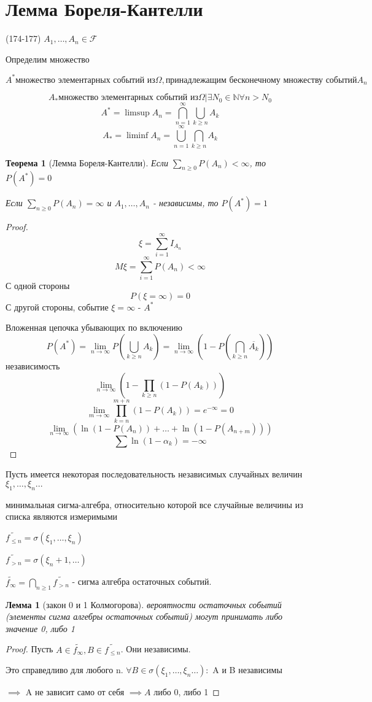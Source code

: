 \documentclass[a4paper]{article}
\newtheorem{theorem}{Теорема}[section]
\newtheorem{lemma}{Лемма}[section]
\theoremstyle{definition}
\theoremstyle{remark}
\begin{document}
\section{Лемма Бореля-Кантелли}
(174-177)
$A_1, \dots, A_n \in \mathcal{F}$

Определим множество 

\[A^* \text{множество элементарных событий из} \Omega, \text{принадлежащим бесконечному множеству событий}A_n\]

\[A_*\text{множество элементарных событий из} \Omega | \exists N_0 \in \mathbb{N}\forall n> N_0 \]
\[A^* = \limsup A_n = \bigcap^\infty_{n = 1} \bigcup_{k\ge n} A_k\]
\[A_* = \liminf A_n = \bigcup^\infty_{n = 1} \bigcap_{k\ge n} A_k\]

\begin{theorem}[Лемма Бореля-Кантелли]
    Если $\sum_{n\ge 0}P(A_n) < \infty$, то $P(A^*) = 0$

    Если $\sum_{n\ge 0}P(A_n) = \infty$ и $A_1, \dots, A_n$ - независимы, то $P(A^*) = 1$
\end{theorem}
\begin{proof}
    \[\xi = \sum_{i = 1}^{\infty}I_{A_n}\]
    \[M\xi = \sum_{i = 1}^\infty P(A_n) <\infty\]
    С одной стороны
    \[P(\xi = \infty) = 0\]
    С другой стороны, событие $\xi = \infty$ - $A^*$
    
    Вложенная цепочка убывающих по включению
    \[P(A^*)= \lim_{n\to \infty}P( \bigcup_{k\ge n }A_k)=\lim_{n\to\infty}(1 - P(\bigcap_{k\ge n}\overline{A_k})) \]
    независимость
    \[\lim_{n\to\infty}(1 - \prod_{k\ge n}(1 - P(A_k)))\]
    \[\lim_{m\to\infty} \prod_{k = n}^{m+n}(1 - P(A_k)) = e^{-\infty} = 0\]
\[\lim_{n\to\infty}(\ln(1 - P(A_n)) + \dots + \ln(1 - P(A_{n+m})))\]
\[\sum \ln(1 - \alpha_k) = -\infty\]
\end{proof}
Пусть имеется некоторая последовательность независимых случайных величин $\xi_1, \dots, \xi_n ...$

минимальная сигма-алгебра, относительно которой все случайные величины из списка являются измеримыми

$\widetilde{f_{\le n}} = \sigma(\xi_1, \dots, \xi_n)$

$\widetilde{f_{> n}} = \sigma(\xi_n+1, \dots)$

$\widetilde{f_\infty} = \bigcap_{n\ge 1} \widetilde{f_{> n}}$ - сигма алгебра остаточных событий.
\begin{lemma}[закон 0 и 1 Колмогорова]
    вероятности остаточных событий (элементы сигма алгебры остаточных событий) могут принимать либо значение 0, либо 1
\end{lemma}
\begin{proof}
    Пусть $A\in \widetilde{f_\infty}, B \in \widetilde{f_{\le n}}$. Они независимы.

    Это справедливо для любого n. $\forall B\in \sigma(\xi_1, \dots, \xi_n \dots): $ A и B независимы

    $\implies $ A не зависит само от себя $\implies A$ либо 0, либо 1


\end{proof}
\end{document}
